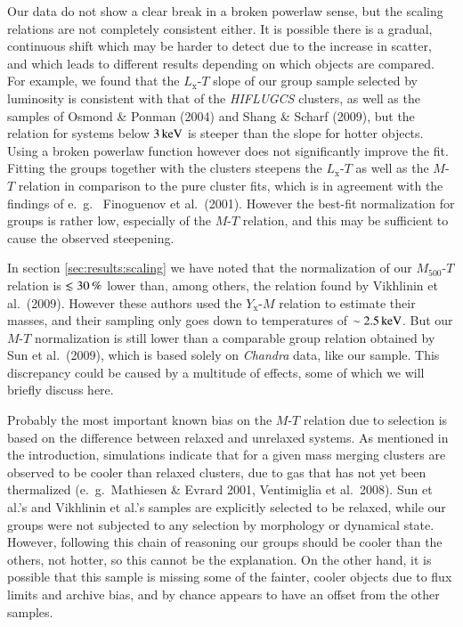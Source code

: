 \documentclass[structabstract]{aa}
\begin{document}
  Our data do not show a clear break in a broken powerlaw sense, but
  the scaling relations are not completely consistent either. It is
  possible there is a gradual, continuous shift which may be harder to
  detect due to the increase in scatter, and which leads to different
  results depending on which objects are compared. For example, we
found that the $L_{\text{x}}$-$T$ slope of our group sample selected
by luminosity is consistent with that of the \emph{HIFLUGCS}
clusters, as well as the samples of Osmond \& Ponman (2004) and
  Shang \& Scharf (2009), but the relation for systems below
$\unit[3]{keV}$ is steeper than the slope for hotter objects.
  Using a broken powerlaw function however does not significantly
  improve the fit.  Fitting the groups together with the clusters
steepens the $L_{\text{x}}$-$T$ as well as the $M$-$T$ relation in
comparison to the pure cluster fits, which is in agreement with the
findings of \mbox{e.\ g.\ } Finoguenov et al.\ (2001). However the
best-fit normalization for groups is rather low, especially of the
$M$-$T$ relation, and this may be sufficient to cause the observed
steepening.

In section \ref{sec:results:scaling} we have noted that the
normalization of our $M_{500}$-$T$ relation is $\lesssim\unit[30]{\%}$
lower than, among others, the relation found by Vikhlinin et al.\
  (2009). However these authors used the $Y_{\text{x}}$-$M$ relation
  to estimate their masses, and their sampling only goes down to
  temperatures of $\sim\unit[2.5]{keV}$. But our $M$-$T$
  normalization is still lower than a comparable group relation
obtained by Sun et al.\ (2009), which is based solely on
  \emph{Chandra} data, like our sample. This discrepancy could be
caused by a multitude of effects, some of which we will briefly
discuss here.

Probably the most important known bias on the $M$-$T$ relation due to
selection is based on the difference between relaxed and unrelaxed
systems. As mentioned in the introduction, simulations indicate that
for a given mass merging clusters are observed to be cooler than
relaxed clusters, due to gas that has not yet been thermalized (e.\
g.\ Mathiesen \& Evrard 2001, Ventimiglia et al.\ 2008). Sun et al.'s
and Vikhlinin et al.'s samples are explicitly selected to be relaxed,
while our groups were not subjected to any selection by morphology or
dynamical state. However, following this chain of reasoning our groups
should be cooler than the others, not hotter, so this cannot be the
explanation. On the other hand, it is possible that this sample is
missing some of the fainter, cooler objects due to flux limits and
archive bias, and by chance appears to have an offset from the other
samples.
\end{document}
